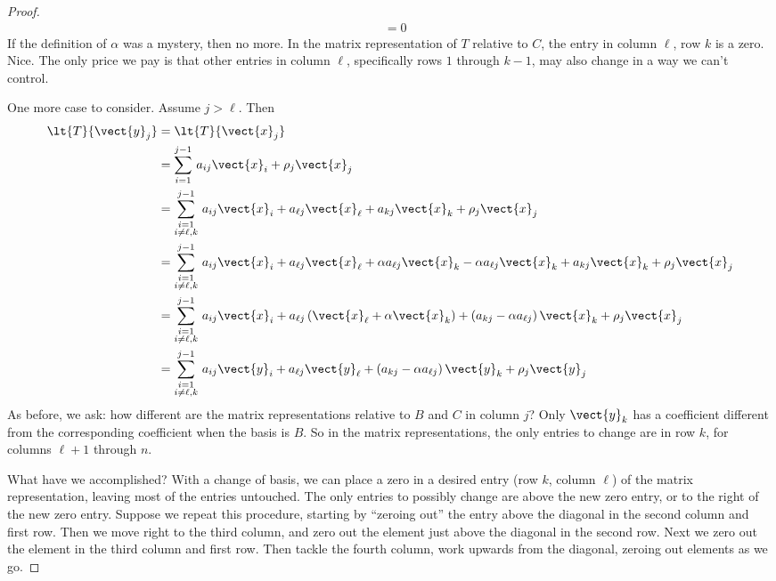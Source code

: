 \begin{proof}
\begin{align*}
&=0
\end{align*}
%
If the definition of $\alpha$ was a mystery, then no more.  In the matrix representation of $T$ relative to $C$, the entry in column $\ell$, row $k$ is a zero.  Nice.  The only price we pay is that other entries in column $\ell$, specifically rows $1$ through $k-1$, may also change in a way we can't control.\par
%
One more case to consider.  Assume $j>\ell$.  Then
%
\begin{align*}
\lt{T}{\vect{y}_j}
&=\lt{T}{\vect{x}_j}\\
%
&=\sum_{i=1}^{j-1}\,a_{ij}\vect{x}_i + \rho_j\vect{x}_j\\
%
&=\sum_{\substack{i=1\\i\neq\ell,k}}^{j-1}\,a_{ij}\vect{x}_i + a_{\ell j}\vect{x}_\ell+ a_{kj}\vect{x}_k + \rho_j\vect{x}_j\\
%
&=\sum_{\substack{i=1\\i\neq\ell,k}}^{j-1}\,a_{ij}\vect{x}_i+
a_{\ell j}\vect{x}_\ell + \alpha a_{\ell j}\vect{x}_k - \alpha a_{\ell j}\vect{x}_k+ a_{kj}\vect{x}_k  + \rho_j\vect{x}_j\\
%
&=\sum_{\substack{i=1\\i\neq\ell,k}}^{j-1}\,a_{ij}\vect{x}_i+
a_{\ell j}\left(\vect{x}_\ell + \alpha\vect{x}_k\right)+
\left(a_{kj}-\alpha a_{\ell j}\right)\vect{x}_k  + \rho_j\vect{x}_j\\
%
&=\sum_{\substack{i=1\\i\neq\ell,k}}^{j-1}\,a_{ij}\vect{y}_i+
a_{\ell j}\vect{y}_\ell+
\left(a_{kj}-\alpha a_{\ell j}\right)\vect{y}_k  + \rho_j\vect{y}_j
%
\end{align*}
%
As before, we ask: how different are the matrix representations relative to $B$ and $C$ in column $j$?  Only $\vect{y}_k$ has a coefficient different from the corresponding coefficient when the basis is $B$.  So in the matrix representations, the only entries to change are in row $k$, for columns $\ell+1$ through $n$.\par
%
What have we accomplished?  With a change of basis, we can place a zero in a desired entry (row $k$, column $\ell$) of the matrix representation, leaving most of the entries untouched.  The only entries to possibly change are above the new zero entry, or to the right of the new zero entry.  Suppose we repeat this procedure, starting by ``zeroing out'' the entry above the diagonal in the second column and first row.  Then we move right to the third column, and zero out the element just above the diagonal in the second row.  Next we zero out the element in the third column and first row.  Then tackle the fourth column, work upwards from the diagonal, zeroing out elements as we go.

\end{proof}
